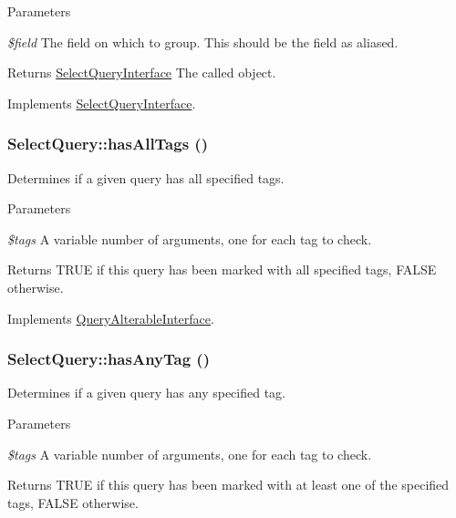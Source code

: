 \begin{DoxyParams}{Parameters}
\item[{\em \$field}]The field on which to group. This should be the field as aliased. \end{DoxyParams}
\begin{DoxyReturn}{Returns}
\hyperlink{interfaceSelectQueryInterface}{SelectQueryInterface} The called object. 
\end{DoxyReturn}


Implements \hyperlink{interfaceSelectQueryInterface_a6074bd3c289da304962ae5250d0b20f9}{SelectQueryInterface}.\hypertarget{classSelectQuery_a4e1f417bc10a31d158260b6534057205}{
\subsubsection[{hasAllTags}]{\setlength{\rightskip}{0pt plus 5cm}SelectQuery::hasAllTags ()}}
\label{classSelectQuery_a4e1f417bc10a31d158260b6534057205}
Determines if a given query has all specified tags.


\begin{DoxyParams}{Parameters}
\item[{\em \$tags}]A variable number of arguments, one for each tag to check.\end{DoxyParams}
\begin{DoxyReturn}{Returns}
TRUE if this query has been marked with all specified tags, FALSE otherwise. 
\end{DoxyReturn}


Implements \hyperlink{interfaceQueryAlterableInterface_a752e1b07ff69e4807fcaeab1aa172c57}{QueryAlterableInterface}.\hypertarget{classSelectQuery_af5d6a2ad80e61e01d211ed769a60e312}{
\subsubsection[{hasAnyTag}]{\setlength{\rightskip}{0pt plus 5cm}SelectQuery::hasAnyTag ()}}
\label{classSelectQuery_af5d6a2ad80e61e01d211ed769a60e312}
Determines if a given query has any specified tag.


\begin{DoxyParams}{Parameters}
\item[{\em \$tags}]A variable number of arguments, one for each tag to check.\end{DoxyParams}
\begin{DoxyReturn}{Returns}
TRUE if this query has been marked with at least one of the specified tags, FALSE otherwise. 
\end{DoxyReturn}


